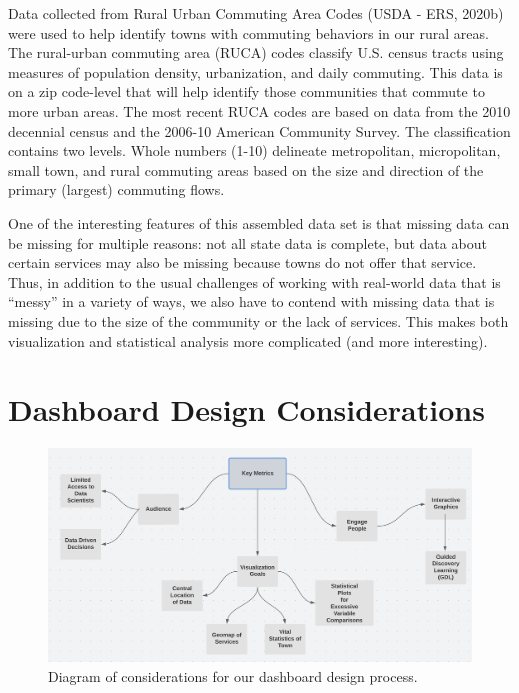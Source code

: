 \documentclass[print]{nuthesis}
\begin{document}
Data collected from Rural Urban Commuting Area Codes (USDA - ERS, 2020b) were used to help identify towns with commuting behaviors in our rural areas. The rural-urban commuting area (RUCA) codes classify U.S. census tracts using measures of population density, urbanization, and daily commuting. This data is on a zip code-level that will help identify those communities that commute to more urban areas. The most recent RUCA codes are based on data from the 2010 decennial census and the 2006-10 American Community Survey. The classification contains two levels. Whole numbers (1-10) delineate metropolitan, micropolitan, small town, and rural commuting areas based on the size and direction of the primary (largest) commuting flows.

One of the interesting features of this assembled data set is that missing data can be missing for multiple reasons: not all state data is complete, but data about certain services may also be missing because towns do not offer that service.
Thus, in addition to the usual challenges of working with real-world data that is ``messy'' in a variety of ways, we also have to contend with missing data that is missing due to the size of the community or the lack of services. This makes both visualization and statistical analysis more complicated (and more interesting).

\hypertarget{dashboard-design-considerations}{%
\section{Dashboard Design Considerations}\label{dashboard-design-considerations}}

\begin{figure}
\hypertarget{fig:metrics}{%
\centering
\includegraphics{figure/KeyMetrics.png}
\caption{Diagram of considerations for our dashboard design process.}\label{fig:metrics}
}
\end{figure}
\end{document}
